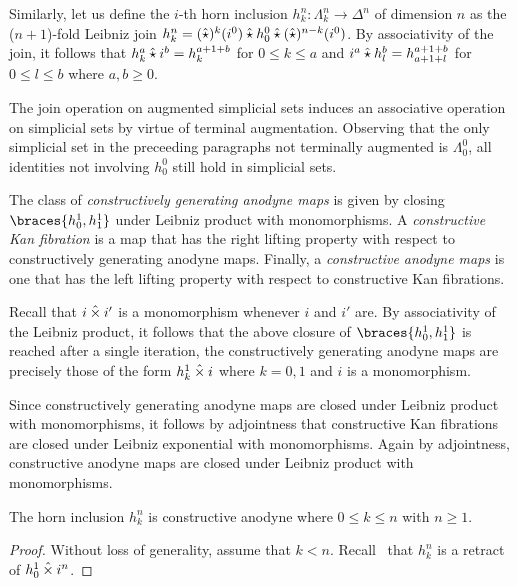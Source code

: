 \documentclass[reqno,10pt,a4paper,oneside]{amsart}
\begin{document}
Similarly, let us define the $i$-th horn inclusion $h_k^n : \Lambda_k^n \to \Delta^n$ of dimension $n$ as the ($n+1$)-fold Leibniz join $h_k^n = (\mathbin{\hat{\star}})^k(i^0) \mathbin{\hat{\star}} h_0^0 \mathbin{\hat{\star}} (\mathbin{\hat{\star}})^{n-k}(i^0)$.
By associativity of the join, it follows that $h_k^a \mathbin{\hat{\star}} i^b = h_k^{a+1+b}$ for $0 \leq k \leq a$ and $i^a \mathbin{\hat{\star}} h_l^b = h_{a+1+l}^{a+1+b}$ for $0 \leq l \leq b$ where $a, b \geq 0$.

The join operation on augmented simplicial sets induces an associative operation on simplicial sets by virtue of terminal augmentation.
Observing that the only simplicial set in the preceeding paragraphs not terminally augmented is $\Lambda_0^0$, all identities not involving $h_0^0$ still hold in simplicial sets.

\begin{definition}
The class of \emph{constructively generating anodyne maps} is given by closing $\braces{h_0^1, h_1^1}$ under Leibniz product with monomorphisms.
A \emph{constructive Kan fibration} is a map that has the right lifting property with respect to constructively generating anodyne maps.
Finally, a \emph{constructive anodyne maps} is one that has the left lifting property with respect to constructive Kan fibrations.
\end{definition}

Recall that $i \mathbin{\hat{\times}} i'$ is a monomorphism whenever $i$ and $i'$ are.
By associativity of the Leibniz product, it follows that the above closure of $\braces{h_0^1, h_1^1}$ is reached after a single iteration, \ie the constructively generating anodyne maps are precisely those of the form $h_k^1 \mathbin{\hat{\times}} i$ where $k = 0, 1$ and $i$ is a monomorphism.

Since constructively generating anodyne maps are closed under Leibniz product with monomorphisms, it follows by adjointness that constructive Kan fibrations are closed under Leibniz exponential with monomorphisms.
Again by adjointness, constructive anodyne maps are closed under Leibniz product with monomorphisms.

\begin{lemma}
\label{horn-constructive-anodyne}
The horn inclusion $h_k^n$ is constructive anodyne where $0 \leq k \leq n$ with $n \geq 1$.
\end{lemma}

\begin{proof}
Without loss of generality, assume that $k < n$.
Recall~\cite[Proposition~2.1.2.6]{lurie:htt} that $h_k^n$ is a retract of $h_0^1 \mathbin{\hat{\times}} i^n$.
\end{proof}
\end{document}
